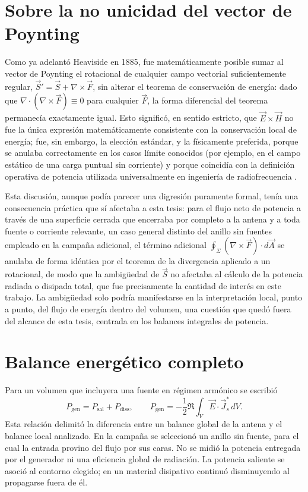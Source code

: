 \section{Sobre la no unicidad del vector de Poynting}
Como ya adelantó Heaviside en 1885, fue matemáticamente posible sumar al vector de Poynting el rotacional de cualquier campo vectorial suficientemente regular, $\vec{S}' = \vec{S} + \nabla\times\vec{F}$, sin alterar el teorema de conservación de energía: dado que $\nabla\cdot(\nabla\times\vec{F})\equiv 0$ para cualquier $\vec{F}$, la forma diferencial del teorema permanecía exactamente igual. Esto significó, en sentido estricto, que $\vec{E}\times\vec{H}$ no fue la única expresión matemáticamente consistente con la conservación local de energía; fue, sin embargo, la elección estándar, y la físicamente preferida, porque se anulaba correctamente en los casos límite conocidos (por ejemplo, en el campo estático de una carga puntual sin corriente) y porque coincidía con la definición operativa de potencia utilizada universalmente en ingeniería de radiofrecuencia \cite{Moree2022}.

Esta discusión, aunque podía parecer una digresión puramente formal, tenía una consecuencia práctica que sí afectaba a esta tesis: para el flujo neto de potencia a través de una superficie cerrada que encerraba por completo a la antena y a toda fuente o corriente relevante, un caso general distinto del anillo sin fuentes empleado en la campaña adicional, el término adicional $\oint_\Sigma(\nabla\times\vec{F})\cdot d\vec{A}$ se anulaba de forma idéntica por el teorema de la divergencia aplicado a un rotacional, de modo que la ambigüedad de $\vec{S}$ no afectaba al cálculo de la potencia radiada o disipada total, que fue precisamente la cantidad de interés en este trabajo. La ambigüedad solo podría manifestarse en la interpretación local, punto a punto, del flujo de energía dentro del volumen, una cuestión que quedó fuera del alcance de esta tesis, centrada en los balances integrales de potencia.

\section{Balance energético completo}
Para un volumen que incluyera una fuente en régimen armónico se escribió
\begin{equation}
P_{\text{gen}}=P_{\text{sal}}+P_{\text{diss}},\qquad
P_{\text{gen}}=-\frac12\Re\int_V\vec E\cdot\vec J_s^*\,dV.
\end{equation}
Esta relación delimitó la diferencia entre un balance global de la antena y el balance local analizado. En la campaña se seleccionó un anillo sin fuente, para el cual la entrada provino del flujo por sus caras. No se midió la potencia entregada por el generador ni una eficiencia global de radiación. La potencia saliente se asoció al contorno elegido; en un material disipativo continuó disminuyendo al propagarse fuera de él.


